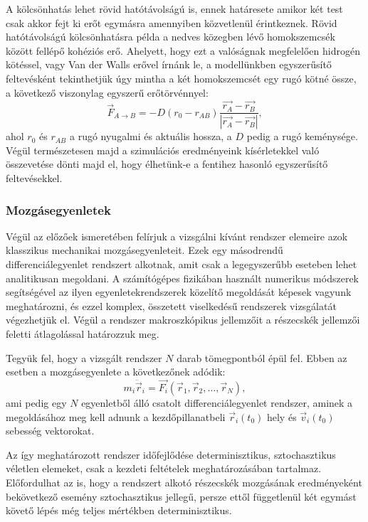 A kölcsönhatás lehet rövid hatótávolságú is, ennek határesete amikor két test csak akkor fejt ki erőt egymásra amennyiben közvetlenül érintkeznek.
Rövid hatótávolságú kölcsönhatásra példa a nedves közegben lévő homokszemcsék között fellépő kohéziós erő. Ahelyett, hogy ezt a valóságnak megfelelően  hidrogén kötéssel, vagy Van der Walls erővel írnánk le, a modellünkben egyszerűsítő feltevésként tekinthetjük úgy mintha a két homokszemcsét egy rugó kötné össze, a következő viszonylag egyszerű erőtörvénnyel:
\begin{equation}
\vec{F}_{A\rightarrow B}=-D(r_{0}-r_{AB})\frac{\vec{r_A}-\vec{r_B}}{|\vec{r_A}-\vec{r_B}|},
\end{equation}
ahol $r_0$ és $r_{AB}$ a rugó nyugalmi és aktuális hossza, a $D$ pedig a rugó keménysége. Végül természetesen majd a szimulációs eredményeink kísérletekkel való összevetése dönti majd el, hogy élhetünk-e a fentihez hasonló egyszerűsítő feltevésekkel.
\subsubsection*{Mozgásegyenletek} 
Végül az előzőek ismeretében felírjuk a vizsgálni kívánt rendszer elemeire azok klasszikus mechanikai mozgásegyenleteit. Ezek egy másodrendű differenciálegyenlet rendszert alkotnak, amit csak a legegyszerűbb eseteben lehet analitikusan megoldani. A számítógépes fizikában használt numerikus módszerek segítségével az ilyen egyenletekrendszerek közelítő megoldását képesek vagyunk meghatározni, és ezzel komplex, összetett viselkedésű rendszerek vizsgálatát végezhetjük el. Végül a rendszer makroszkópikus jellemzőit a részecskék jellemzői feletti átlagolással határozzuk meg. 

Tegyük fel, hogy a vizsgált rendszer $N$ darab tömegpontból épül fel. Ebben az esetben a mozgásegyenlete a következőnek adódik:
\begin{equation}
m_{i}\ddot{\vec{r}}_{i}=\vec{F_i}(\vec{r}_1,\vec{r}_2,\dots,\vec{r}_N),
\end{equation}
ami pedig egy $N$ egyenletből álló csatolt differenciálegyenlet rendszer, aminek a megoldásához meg kell adnunk a kezdőpillanatbeli $\vec{r}_i(t_0)$ hely és $\vec{v}_i(t_0)$ sebesség vektorokat.

Az így meghatározott rendszer időfejlődése determinisztikus, sztochasztikus véletlen elemeket, csak a kezdeti feltételek meghatározásában tartalmaz. Előfordulhat az is, hogy a rendszert alkotó részecskék mozgásának eredményeként bekövetkező esemény sztochasztikus jellegű, persze ettől függetlenül két egymást követő lépés még teljes mértékben determinisztikus. 

